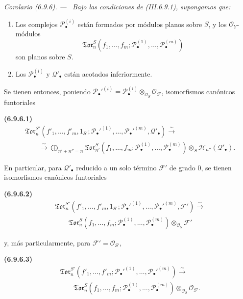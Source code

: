 \documentclass[10pt,oneside]{book}
\newcommand{\sref}[2][]{\textup{(#2)}}
\newcommand{\oldpage}[2][]{\setcounter{footnote}{0}\marginpar{\scriptsize\textbf{#1}~|~#2}\ignorespaces}
\newenvironment{env}[1][]{\par\medskip\noindent\textbf{(#1)}\ }{\par}
\newenvironment{corollary}[1][]{\par\medskip\noindent\itshape Corolario (#1). ---\ }{\par}
\begin{document}
\begin{corollary}[6.9.6]
\label{III.6.9.6}
Bajo las condiciones de \sref{III.6.9.1}, supongamos que:
\begin{enumerate}
  \item[$1^\circ$] Los complejos $\mathscr P_\bullet^{(i)}$ están formados
  por módulos planos sobre $S$, y los $\mathscr O_Y$-módulos
  \[
    \mathfrak{Tor}_n^S
    (f_1,\ldots,f_m;
     \mathscr P_\bullet^{(1)},\ldots,\mathscr P_\bullet^{(m)})
  \]
  son planos sobre $S$.
  \item[$2^\circ$] Los $\mathscr P_\bullet^{(i)}$ y
  $\mathscr Q'_\bullet$ están acotados inferiormente.
\end{enumerate}

\oldpage[III]{169}
Se tienen entonces, poniendo
$\mathscr P_\bullet'^{(i)}=
\mathscr P_\bullet^{(i)}\otimes_{\mathscr O_S}\mathscr O_{S'}$,
isomorfismos canónicos funtoriales
\begin{env}[6.9.6.1]
\label{III.6.9.6.1}
\[
\begin{split}
  &\mathfrak{Tor}_n^{S'}
  (f'_1,\ldots,f'_m,1_{S'};
   \mathscr P_\bullet'^{(1)},\ldots,
   \mathscr P_\bullet'^{(m)},\mathscr Q'_\bullet)
  \xrightarrow{\sim}\\
  &\qquad\xrightarrow{\sim}
  \bigoplus_{n'+n''=n}
  \mathfrak{Tor}_{n'}^S
  (f_1,\ldots,f_m;
   \mathscr P_\bullet^{(1)},\ldots,
   \mathscr P_\bullet^{(m)})
  \otimes_S\mathscr H_{n''}(\mathscr Q'_\bullet).
\end{split}
\tag{6.9.6.1}\label{III.6.9.6.1.eq}
\]
\end{env}
En particular, para $\mathscr Q'_\bullet$ reducido a un solo término
$\mathscr F'$ de grado $0$, se tienen isomorfismos canónicos funtoriales
\begin{env}[6.9.6.2]
\label{III.6.9.6.2}
\[
\begin{split}
  &\mathfrak{Tor}_n^{S'}
  (f'_1,\ldots,f'_m,1_{S'};
   \mathscr P_\bullet'^{(1)},\ldots,
   \mathscr P_\bullet'^{(m)},\mathscr F')
  \xrightarrow{\sim}\\
  &\qquad
  \mathfrak{Tor}_n^S
  (f_1,\ldots,f_m;
   \mathscr P_\bullet^{(1)},\ldots,
   \mathscr P_\bullet^{(m)})
  \otimes_{\mathscr O_S}\mathscr F'
\end{split}
\tag{6.9.6.2}\label{III.6.9.6.2.eq}
\]
\end{env}
y, más particularmente, para $\mathscr F'=\mathscr O_{S'}$,
\begin{env}[6.9.6.3]
\label{III.6.9.6.3}
\[
\begin{split}
  &\mathfrak{Tor}_n^{S'}
  (f'_1,\ldots,f'_m;
   \mathscr P_\bullet'^{(1)},\ldots,
   \mathscr P_\bullet'^{(m)})
  \xrightarrow{\sim}\\
  &\qquad
  \mathfrak{Tor}_n^S
  (f_1,\ldots,f_m;
   \mathscr P_\bullet^{(1)},\ldots,
   \mathscr P_\bullet^{(m)})
  \otimes_{\mathscr O_S}\mathscr O_{S'}.
\end{split}
\tag{6.9.6.3}\label{III.6.9.6.3.eq}
\]
\end{env}
\end{corollary}
\end{document}
